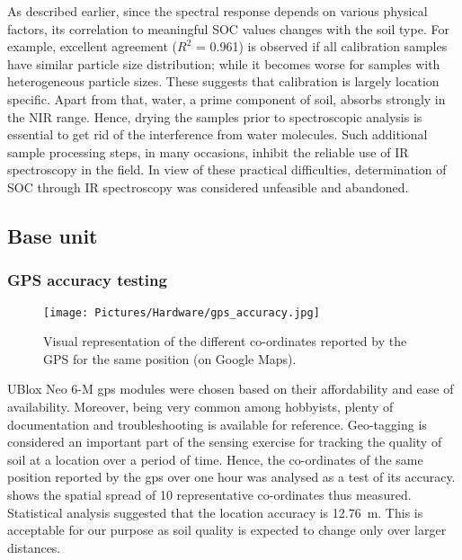 As described earlier, since the spectral response depends on various physical factors, its correlation to meaningful \gls{SOC} values changes with the soil type. For example, excellent agreement ($R^{2}$ = 0.961) is observed if all calibration samples have similar particle size distribution; while it becomes worse for samples with heterogeneous particle sizes.\cite{Russel2003} These suggests that calibration is largely location specific. Apart from that, water, a prime component of soil, absorbs strongly in the \gls{NIR} range. Hence, drying the samples prior to spectroscopic analysis is essential to get rid of the interference from water molecules. Such additional sample processing steps, in many occasions, inhibit the reliable use of \gls{IR} spectroscopy in the field. In view of these practical difficulties, determination of \gls{SOC} through IR spectroscopy was considered unfeasible and abandoned. 



\tocless \subsection{Base unit}
\subsubsection{GPS accuracy testing}\label{section:gps_accuracy}
 \begin{figure}[ht]
		    \centering
	   \texttt{[image: Pictures/Hardware/gps\_accuracy.jpg]}
			\caption{Visual representation of the different co-ordinates reported by the GPS for the same position (on Google Maps).}
			\label{gps_accuracy}
    	\end{figure}
UBlox Neo 6-M \gls{gps} modules were chosen based on their affordability and ease of availability. Moreover, being very common among hobbyists, plenty of documentation and troubleshooting is available for reference. Geo-tagging is considered an important part of the sensing exercise for tracking the quality of soil at a location over a period of time. Hence, the co-ordinates of the same position reported by the \gls{gps} over one hour was analysed as a test of its accuracy.  shows the spatial spread of 10 representative co-ordinates thus measured. Statistical analysis suggested that the location accuracy is \SI{12.76}{m}. This is acceptable for our purpose as soil quality is expected to change only over larger distances. 

